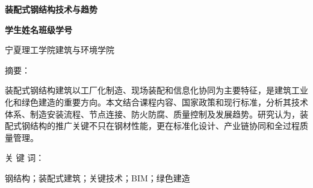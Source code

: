 \documentclass[UTF8,a4paper,10.5pt]{ctexart}
\begin{document}
\begin{center}
  {\heiti\bfseries 装配式钢结构技术与趋势\par}
  \vspace{0.8em}
  {\kaishu\bfseries 学生姓名\quad 班级\quad 学号\par}
  \vspace{0.5em}
  {\songti 宁夏理工学院建筑与环境学院\par}
\end{center}

{\heiti 摘\quad 要：}
{\songti
装配式钢结构建筑以工厂化制造、现场装配和信息化协同为主要特征，是建筑工业化和绿色建造的重要方向。本文结合课程内容、国家政策和现行标准，分析其技术体系、制造安装流程、节点连接、防火防腐、质量控制及发展趋势。研究认为，装配式钢结构的推广关键不只在钢材性能，更在标准化设计、产业链协同和全过程质量管理。
\par}

\vspace{0.4em}
{\heiti 关 键 词：}
{\songti 钢结构；装配式建筑；关键技术；BIM；绿色建造\par}

\vspace{0.8em}
\end{document}
